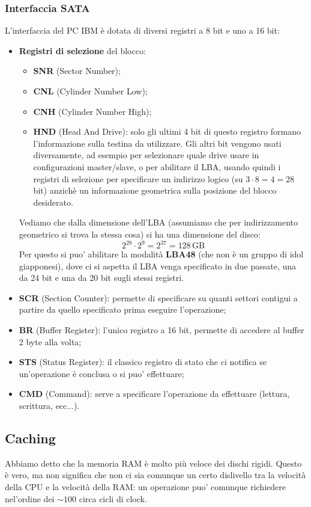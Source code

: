 \documentclass[a4paper,11pt]{article}
\begin{document}
\subsubsection{Interfaccia SATA}
L'interfaccia del PC IBM è dotata di diversi registri a 8 bit e uno a 16 bit:
\begin{itemize}
	\item \textbf{Registri di selezione} del blocco:
		\begin{itemize}
			\item \textbf{SNR} (Sector Number);
			\item \textbf{CNL} (Cylinder Number Low);
			\item \textbf{CNH} (Cylinder Number High);
			\item \textbf{HND} (Head And Drive): solo gli ultimi 4 bit di questo registro formano l'informazione sulla testina da utilizzare.
				Gli altri bit vengono usati diversamente, ad esempio per selezionare quale drive usare in configurazioni master/slave, o per abilitare il LBA, usando quindi i registri di selezione per specificare un indirizzo logico (su $3 \cdot 8 = 4 = 28$ bit) anzichè un informazione geometrica sulla posizione del blocco desiderato.
		\end{itemize}

		Vediamo che dalla dimensione dell'LBA (assumiamo che per indirizzamento geometrico si trova la stessa cosa) si ha una dimensione del disco:
		$$
		2^{28} \cdot 2^9 = 2^{37} = 128 \, \mathrm{GB}
		$$
		Per questo si puo' abilitare la modalità \textbf{LBA48} (che non è un gruppo di idol giapponesi), dove ci si aspetta il LBA venga specificato in due passate, una da 24 bit e una da 20 bit sugli stessi registri.
	\item \textbf{SCR} (Section Counter): permette di specificare su quanti settori contigui a partire da quello specificato prima eseguire l'operazione;
	\item \textbf{BR} (Buffer Register): l'unico registro a 16 bit, permette di accedere al buffer 2 byte alla volta;
	\item \textbf{STS} (Status Register): il classico registro di stato che ci notifica se un'operazione è conclusa o si puo' effettuare;
	\item \textbf{CMD} (Command): serve a specificare l'operazione da effettuare (lettura, scrittura, ecc...).
\end{itemize}

\subsection{Caching}
Abbiamo detto che la memoria RAM è molto più veloce dei dischi rigidi.
Questo è vero, ma non significa che non ci sia comunque un certo dislivello tra la velocità della CPU e la velocità della RAM: un operazione puo' comunque richiedere nel'ordine dei $\sim 100$ circa cicli di clock.
\end{document}
